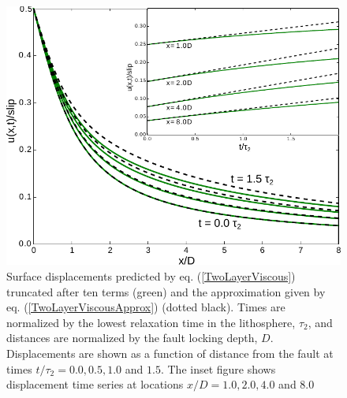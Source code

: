 \documentclass[extra]{gji}
\begin{document}
\begin{figure}\label{figure1}
  \centering 
  \includegraphics[scale=0.8]{FinalFigures/Figure1.pdf}
  \caption{Surface displacements predicted by
    eq. (\ref{TwoLayerViscous}) truncated after ten terms (green) and
    the approximation given by eq. (\ref{TwoLayerViscousApprox})
    (dotted black).  Times are normalized by the lowest relaxation
    time in the lithosphere, $\tau_2$, and distances are normalized by
    the fault locking depth, $D$.  Displacements are shown as a
    function of distance from the fault at times $t/\tau_2 =
    0.0,0.5,1.0$ and $1.5$. The inset figure shows displacement time
    series at locations $x/D = 1.0, 2.0, 4.0$ and $8.0$}
  \label{Figure 1}
\end{figure} 
\end{document}
